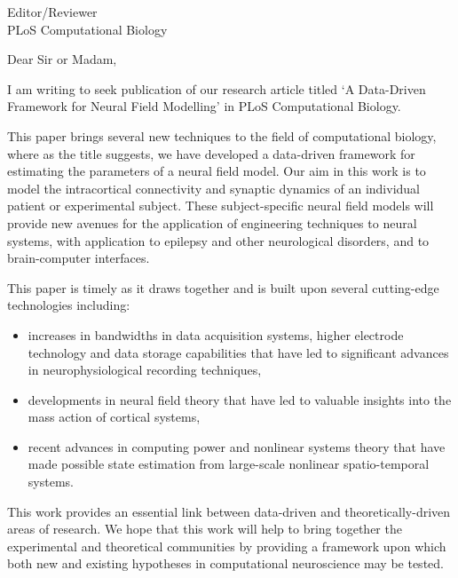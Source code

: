 \documentclass[a4paper,10pt]{letter}
\begin{document}
\vspace{-1cm}
\begin{letter}{Editor/Reviewer \\ PLoS Computational Biology}

\opening{Dear Sir or Madam,}




I am writing to seek publication of our research article titled `A Data-Driven Framework for Neural Field Modelling' in PLoS Computational Biology.

This paper brings several new techniques to the field of computational biology, where as the title suggests, we have developed a data-driven framework for estimating the parameters of a neural field model. Our aim in this work is to model the intracortical connectivity and synaptic dynamics of an individual patient or experimental subject. These subject-specific neural field models will provide new avenues for the application of engineering techniques to neural systems, with application to epilepsy and other neurological disorders, and to brain-computer interfaces.

This paper is timely as it draws together and is built upon several cutting-edge technologies including:
\begin{itemize}
	\item increases in bandwidths in data acquisition systems, higher electrode technology and data storage capabilities that have led to significant advances in neurophysiological recording techniques, 
	\item developments in neural field theory that have led to valuable insights into the mass action of cortical systems,
	\item recent advances in computing power and nonlinear systems theory that have made possible state estimation from large-scale nonlinear spatio-temporal systems.
\end{itemize}

This work provides an essential link between data-driven and theoretically-driven areas of research. We hope that this work will help to bring together the experimental and theoretical communities by providing a framework upon which both new and existing hypotheses in computational neuroscience may be tested.


\end{letter}
\end{document}
